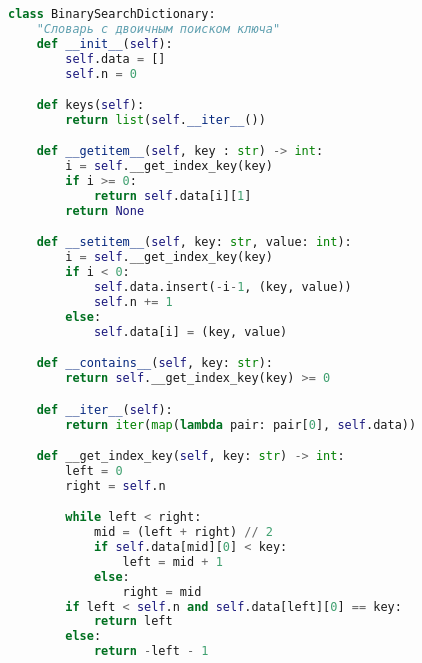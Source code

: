         \begin{lstlisting}[language=python, label=lst:binary, caption=Реализация алгоритма двоичного поиска слова в словаре]
class BinarySearchDictionary:
    "Словарь с двоичным поиском ключа"
    def __init__(self):
        self.data = []
        self.n = 0

    def keys(self):
        return list(self.__iter__())

    def __getitem__(self, key : str) -> int:
        i = self.__get_index_key(key)
        if i >= 0:
            return self.data[i][1]
        return None

    def __setitem__(self, key: str, value: int):
        i = self.__get_index_key(key)
        if i < 0:
            self.data.insert(-i-1, (key, value))
            self.n += 1
        else:
            self.data[i] = (key, value)

    def __contains__(self, key: str):
        return self.__get_index_key(key) >= 0

    def __iter__(self):
        return iter(map(lambda pair: pair[0], self.data))

    def __get_index_key(self, key: str) -> int:
        left = 0
        right = self.n

        while left < right:
            mid = (left + right) // 2
            if self.data[mid][0] < key:
                left = mid + 1
            else:
                right = mid
        if left < self.n and self.data[left][0] == key:
            return left
        else:
            return -left - 1
        \end{lstlisting}

